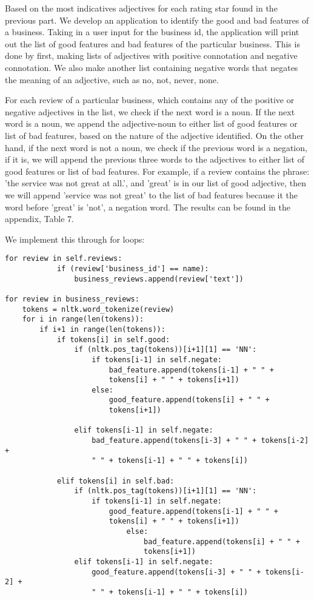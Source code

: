 Based on the most indicatives adjectives for each rating star found in the previous part. We develop an application to identify the good and bad features of a business. Taking in a user input for the business id, the application will print out the list of good features and bad features of the particular business. This is done by first, making lists of adjectives with positive connotation and negative connotation. We also make another list containing negative words that negates the meaning of an adjective, such as no, not, never, none. 

For each review of a particular business, which contains any of the positive or negative adjectives in the list, we check if the next word is a noun. If the next word is a noun, we append the adjective-noun to either list of good features or list of bad features, based on the nature of the adjective identified. On the other hand, if the next word is not a noun, we check if the previous word is a negation, if it is, we will append the previous three words to the adjectives to either list of good features or list of bad features. For example, if a review contains the phrase: 'the service was not great at all.', and 'great' is in our list of good adjective, then we will append 'service was not great' to the list of bad features because it the word before 'great' is 'not', a negation word. The results can be found in the appendix, Table 7.

We implement this through for loops:

\begin{Verbatim}[fontsize=\tiny]
for review in self.reviews:
            if (review['business_id'] == name):
                business_reviews.append(review['text'])

for review in business_reviews:
    tokens = nltk.word_tokenize(review)
    for i in range(len(tokens)):
        if i+1 in range(len(tokens)):
            if tokens[i] in self.good:
                if (nltk.pos_tag(tokens))[i+1][1] == 'NN':
                    if tokens[i-1] in self.negate:
                        bad_feature.append(tokens[i-1] + " " + 
                        tokens[i] + " " + tokens[i+1])
                    else:
                        good_feature.append(tokens[i] + " " + 
                        tokens[i+1])

                elif tokens[i-1] in self.negate:
                    bad_feature.append(tokens[i-3] + " " + tokens[i-2] + 
                    " " + tokens[i-1] + " " + tokens[i])

            elif tokens[i] in self.bad:
                if (nltk.pos_tag(tokens))[i+1][1] == 'NN':
                    if tokens[i-1] in self.negate:
                        good_feature.append(tokens[i-1] + " " + 
                        tokens[i] + " " + tokens[i+1])
                            else:
                                bad_feature.append(tokens[i] + " " + 
                                tokens[i+1])
                elif tokens[i-1] in self.negate:
                    good_feature.append(tokens[i-3] + " " + tokens[i-2] + 
                    " " + tokens[i-1] + " " + tokens[i])
\end{Verbatim}

